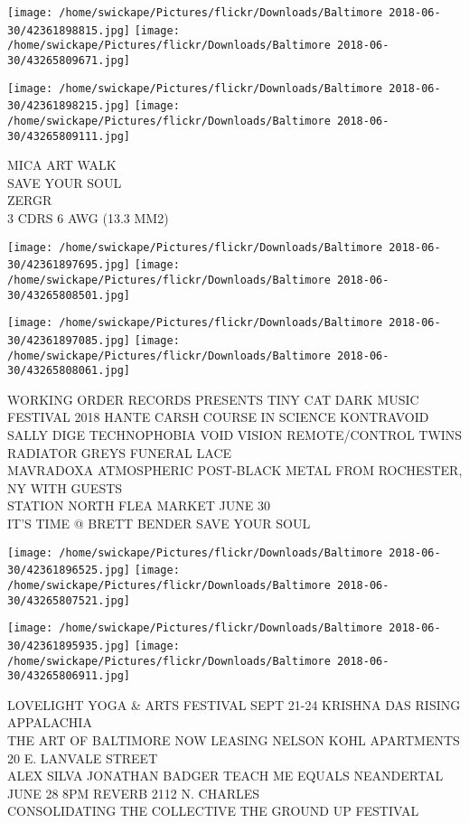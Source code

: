 \documentclass[10pt,letterpaper]{article}
\begin{document}
\texttt{[image: /home/swickape/Pictures/flickr/Downloads/Baltimore 2018-06-30/42361898815.jpg]}
\texttt{[image: /home/swickape/Pictures/flickr/Downloads/Baltimore 2018-06-30/43265809671.jpg]}

\texttt{[image: /home/swickape/Pictures/flickr/Downloads/Baltimore 2018-06-30/42361898215.jpg]}
\texttt{[image: /home/swickape/Pictures/flickr/Downloads/Baltimore 2018-06-30/43265809111.jpg]}

MICA ART WALK\\
SAVE YOUR SOUL\\
ZERGR\\
3 CDRS 6 AWG (13.3 MM2)
\pagebreak

\texttt{[image: /home/swickape/Pictures/flickr/Downloads/Baltimore 2018-06-30/42361897695.jpg]}
\texttt{[image: /home/swickape/Pictures/flickr/Downloads/Baltimore 2018-06-30/43265808501.jpg]}

\texttt{[image: /home/swickape/Pictures/flickr/Downloads/Baltimore 2018-06-30/42361897085.jpg]}
\texttt{[image: /home/swickape/Pictures/flickr/Downloads/Baltimore 2018-06-30/43265808061.jpg]}

WORKING ORDER RECORDS PRESENTS TINY CAT DARK MUSIC FESTIVAL 2018 HANTE CARSH COURSE IN SCIENCE KONTRAVOID SALLY DIGE TECHNOPHOBIA VOID VISION REMOTE/CONTROL TWINS RADIATOR GREYS FUNERAL LACE\\
MAVRADOXA ATMOSPHERIC POST{-}BLACK METAL FROM ROCHESTER, NY WITH GUESTS\\
STATION NORTH FLEA MARKET JUNE 30\\
IT'S TIME @ BRETT BENDER SAVE YOUR SOUL
\pagebreak

\texttt{[image: /home/swickape/Pictures/flickr/Downloads/Baltimore 2018-06-30/42361896525.jpg]}
\texttt{[image: /home/swickape/Pictures/flickr/Downloads/Baltimore 2018-06-30/43265807521.jpg]}

\texttt{[image: /home/swickape/Pictures/flickr/Downloads/Baltimore 2018-06-30/42361895935.jpg]}
\texttt{[image: /home/swickape/Pictures/flickr/Downloads/Baltimore 2018-06-30/43265806911.jpg]}

LOVELIGHT YOGA \& ARTS FESTIVAL SEPT 21{-}24 KRISHNA DAS RISING APPALACHIA\\
THE ART OF BALTIMORE NOW LEASING NELSON KOHL APARTMENTS 20 E. LANVALE STREET\\
ALEX SILVA JONATHAN BADGER TEACH ME EQUALS NEANDERTAL JUNE 28 8PM REVERB 2112 N. CHARLES\\
CONSOLIDATING THE COLLECTIVE THE GROUND UP FESTIVAL
\pagebreak
\end{document}
